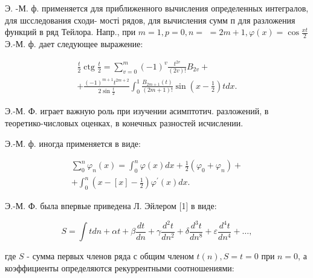 \documentclass[10pt]{article}
\begin{document}
Э. -М. ф. применяется для приближенного вычисления определенных интегралов, для шсследования сходи- мості рядов, для вычисления сумм п для разложения функций в ряд Тейлора. Напр., при $m=1, p=0, n=$ $=2 m+1, \varphi(x)=\cos \frac{x t}{2}$ Э.-М. ф. дает следующее выражение:



\[

\begin{gathered}

\frac{t}{2} \operatorname{ctg} \frac{t}{2}=\sum_{v=0}^{m}(-1)^{v} \frac{t^{2 v}}{(2 v) !} B_{2 v}+ \\

+\frac{(-1)^{m+1} t^{2 m+2}}{2 \sin \frac{t}{2}} \int_{0}^{1} \frac{B_{2 m+1}(t)}{(2 m+1) !} \sin \left(x-\frac{1}{2}\right) t d x .

\end{gathered}

\]



Э.-М. Ф. играет важную роль при изучении асимптотич. разложений, в теоретико-числовых оценках, в конечных разностей исчислении.



Э.-М. ф. иногда применяется в виде:



\[

\begin{gathered}

\sum_{0}^{n} \varphi_{n}(x)=\int_{0}^{n} \varphi(x) d x+\frac{1}{2}\left(\varphi_{0}+\varphi_{n}\right)+ \\

+\int_{0}^{n}\left(x-[x]-\frac{1}{2}\right) \varphi^{\prime}(x) d x .

\end{gathered}

\]



Э.-М. Ф. была впервые приведена Л. Эйлером [1] в виде:



\[

S=\int t d n+\alpha t+\beta \frac{d t}{d n}+\gamma \frac{d^{2} t}{d n^{2}}+\delta \frac{d^{3} t}{d n^{8}}+\varepsilon \frac{d^{4} t}{d n^{4}}+\ldots,

\]



где $S$ - сумма первых членов ряда с общим членом $t(n), S=t=0$ при $n=0$, а коэффициенты определяются рекуррентными соотношениями:
\end{document}
